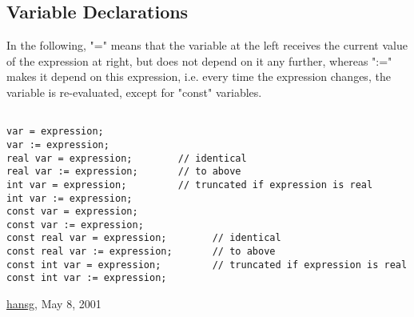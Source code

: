 




\subsection{Variable Declarations}
 In the following, "=" means that the variable at the left receives the current value of the expression at right, but does not depend on it any further, whereas ":=" makes it depend on this expression, i.e. every time the expression changes, the variable is re-evaluated, except for "const" variables. 
\begin{verbatim}

var = expression;
var := expression;
real var = expression;        // identical
real var := expression;       // to above
int var = expression;         // truncated if expression is real
int var := expression;
const var = expression;
const var := expression;
const real var = expression;        // identical
const real var := expression;       // to above
const int var = expression;         // truncated if expression is real
const int var := expression;
\end{verbatim}

\href{http://www.cern.ch/Hans.Grote/hansg_sign.html}{hansg}, May 8, 2001 

